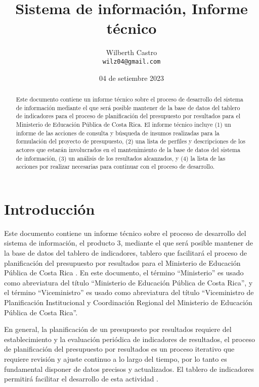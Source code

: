 \documentclass[9pt,a4paper]{IEEEtran}
\begin{document}
\title{Sistema de informaci\'on, Informe t\'ecnico}

\author{
	Wilberth Castro \\
	\small{\texttt{wilz04@gmail.com}}
}

\date{\small{04 de setiembre 2023}}

\maketitle


\begin{abstract}
	Este documento contiene un informe t\'ecnico sobre el proceso de desarrollo del sistema de informaci\'on mediante el que ser\'a posible mantener de la base de datos del tablero de indicadores para el proceso de planificaci\'on del presupuesto por resultados para el Ministerio de Educaci\'on P\'ublica de Costa Rica. El informe t\'ecnico incluye (1) un informe de las acciones de consulta y b\'usqueda de insumos realizadas para la formulaci\'on del proyecto de presupuesto, (2) una lista de perfiles y descripciones de los actores que estar\'an involucrados en el mantenimiento de la base de datos del sistema de informaci\'on, (3) un an\'alisis de los resultados alcanzados, y (4) la lista de las acciones por realizar necesarias para continuar con el proceso de desarrollo.
\end{abstract}

\section{Introducci\'on} \label{sec:intro}

Este documento contiene un informe t\'ecnico sobre el proceso de desarrollo del sistema de informaci\'on, el producto 3, mediante el que ser\'a posible mantener de la base de datos del tablero de indicadores, tablero que facilitar\'a el proceso de planificaci\'on del presupuesto por resultados para el Ministerio de Educaci\'on P\'ublica de Costa Rica \cite{userm}. En este documento, el t\'ermino ``Ministerio'' es usado como abreviatura del t\'itulo ``Ministerio de Educaci\'on P\'ublica de Costa Rica'', y el t\'ermino ``Viceministro'' es usado como abreviatura del t\'itulo ``Viceministro de Planificaci\'on Institucional y Coordinaci\'on Regional del Ministerio de Educaci\'on P\'ublica de Costa Rica''.

En general, la planificaci\'on de un presupuesto por resultados requiere del establecimiento y la evaluaci\'on peri\'odica de indicadores de resultados, el proceso de planificaci\'on del presupuesto por resultados es un proceso iterativo que requiere revisi\'on y ajuste continuo a lo largo del tiempo, por lo tanto es fundamental disponer de datos precisos y actualizados. El tablero de indicadores permitir\'a facilitar el desarrollo de esta actividad \cite{userm}.
\end{document}
